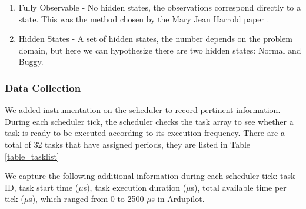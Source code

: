 \begin{enumerate}
  \item Fully Observable - No hidden states, the observations
    correspond directly to a state. This was the method chosen by the
    Mary Jean Harrold paper \cite{baah_2006}. 
  \item Hidden States - A set of hidden states, the number depends on
    the problem domain, but here we can hypothesize there are two
    hidden states: Normal and Buggy. 
\end{enumerate}

\subsubsection{Data Collection}
We added instrumentation on the scheduler to record pertinent
information. During each scheduler tick, the scheduler checks the task
array to see whether a task is ready to be executed according to its
execution frequency. There are a total of 32 tasks that have assigned
periods, they are listed in Table \ref{table_tasklist}

We capture the following additional information during each scheduler
tick: task ID, task start time ($\mu$s), task execution duration
($\mu$s), total available time per tick ($\mu$s), which ranged from 0
to 2500 $\mu$s in Ardupilot.

